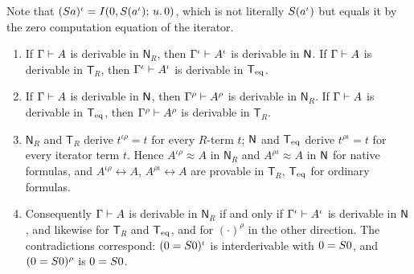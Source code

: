 Note that $(S a)^{\iota}=I(0,S(a^{\iota});\,u.\,0)$, which is not
literally $S(a^{\iota})$ but equals it by the zero computation equation of
the iterator.

\begin{theorem}\label{seed:thm:succ-terms}
\leavevmode
\begin{enumerate}[label=(\alph*),nosep]
\item If $\Gamma\vdash A$ is derivable in $\mathsf{N}_R$, then
$\Gamma^{\iota}\vdash A^{\iota}$ is derivable in $\mathsf{N}$. If
$\Gamma\vdash A$ is derivable in $\mathsf{T}_R$, then
$\Gamma^{\iota}\vdash A^{\iota}$ is derivable in $\mathsf{T}_{\mathrm{eq}}$.
\item If $\Gamma\vdash A$ is derivable in $\mathsf{N}$, then
$\Gamma^{\rho}\vdash A^{\rho}$ is derivable in $\mathsf{N}_R$. If
$\Gamma\vdash A$ is derivable in $\mathsf{T}_{\mathrm{eq}}$, then
$\Gamma^{\rho}\vdash A^{\rho}$ is derivable in $\mathsf{T}_R$.
\item $\mathsf{N}_R$ and $\mathsf{T}_R$ derive $t^{\iota\rho}=t$ for every
$R$-term $t$; $\mathsf{N}$ and $\mathsf{T}_{\mathrm{eq}}$ derive $t^{\rho\iota}=t$ for every iterator
term $t$. Hence $A^{\iota\rho}\approx A$ in $\mathsf{N}_R$ and
$A^{\rho\iota}\approx A$ in $\mathsf{N}$ for native formulas, and
$A^{\iota\rho}\leftrightarrow A$, $A^{\rho\iota}\leftrightarrow A$ are
provable in $\mathsf{T}_R$, $\mathsf{T}_{\mathrm{eq}}$ for ordinary formulas.
\item Consequently $\Gamma\vdash A$ is derivable in $\mathsf{N}_R$ if and
only if $\Gamma^{\iota}\vdash A^{\iota}$ is derivable in $\mathsf{N}$, and
likewise for $\mathsf{T}_R$ and $\mathsf{T}_{\mathrm{eq}}$, and for $(\cdot)^{\rho}$ in the other
direction. The contradictions correspond: $(0=S 0)^{\iota}$ is
interderivable with $0=S 0$, and $(0=S 0)^{\rho}$ is $0=S 0$.
\end{enumerate}
\end{theorem}

